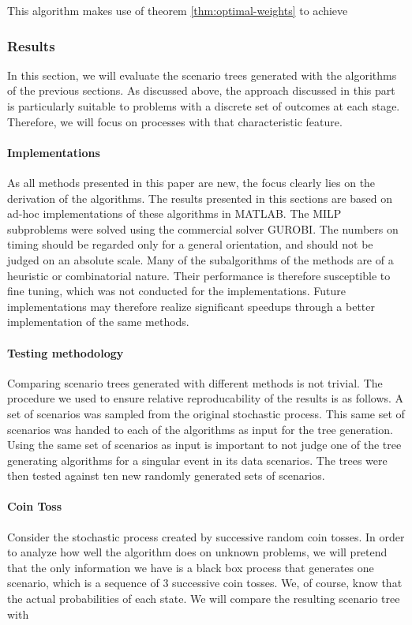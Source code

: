 This algorithm makes use of theorem \ref{thm:optimal-weights} to achieve  
\subsubsection{Results}
In this section, we will evaluate the scenario trees generated with the algorithms of the previous sections. As discussed above, the approach discussed in this part is particularly suitable to problems with a discrete set of outcomes at each stage. Therefore, we will focus on processes with that characteristic feature.
%
\paragraph{Implementations}
As all methods presented in this paper are new, the focus clearly lies on the derivation of the algorithms.
The results presented in this sections are based on ad-hoc implementations of these algorithms in MATLAB.
The MILP subproblems were solved using the commercial solver GUROBI.
The numbers on timing should be regarded only for a general orientation, and should not be judged on an absolute scale.
Many of the subalgorithms of the methods are of a heuristic or combinatorial nature.
Their performance is therefore susceptible to fine tuning, which was not conducted for the implementations.
Future implementations may therefore realize significant speedups through a better implementation of the same methods.
%
\paragraph{Testing methodology} 
Comparing scenario trees generated with different methods is not trivial.
The procedure we used to ensure relative reproducability of the results is as follows.
A set of scenarios was sampled from the original stochastic process.
This same set of scenarios was handed to each of the algorithms as input for the tree generation.
Using the same set of scenarios as input is important to not judge one of the tree generating algorithms for a singular event in its data scenarios.
The trees were then tested against ten new randomly generated sets of scenarios.
\paragraph{Coin Toss} Consider the stochastic process created by successive random coin tosses.
In order to analyze how well the algorithm does on unknown problems, we will pretend that the only information we have is a black box process that generates one scenario, which is a sequence of 3 successive coin tosses.
We, of course, know that the actual probabilities of each state.
We will compare the resulting scenario tree with
